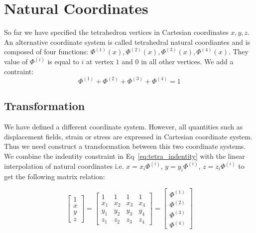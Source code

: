 \documentclass[en]{minipw} %
\begin{document}
\section{Natural Coordinates}

So far we have specified the tetrahedron vertices in Cartesian coordinates $x,y,z$. An alternative coordinate system is called tetrahedral natural coordiantes and is composed of four functions: $\Phi^{(1)}(x), \Phi^{(2)}(x), \Phi^{(3)}(x), \Phi^{(4)}(x)$. They value of $\Phi^{(i)}$ is equal to $i$ at vertex $1$ and 0 in all other vertices. We add a contraint:
\begin{equation}
\label{eq:tetra_indentity}
\Phi^{(1)} + \Phi^{(2)} + \Phi^{(3)} + \Phi^{(4)} = 1
\end{equation}

\subsection{Transformation}

We have defined a different coordinate system. However, all quantities such as displacement fields, strain or stress are expressed in Cartesian coordinate system. Thus we need construct a transformation between this two coordinate systems. We combine the indentity constraint in Eq~\ref{eq:tetra_indentity} with the linear interpolation of natural coordinates i.e. $x = x_i \Phi^{(i)}$, $y = y_i \Phi^{(i)}$, $z = z_i \Phi^{(i)}$ to get the following matrix relation:

\begin{equation}
\begin{bmatrix}
1 \\
x \\
y \\
z
\end{bmatrix}
=
\begin{bmatrix}
1 & 1 & 1 & 1 \\
x_1 & x_2 & x_3 & x_4 \\
y_1 & y_2 & y_3 & y_4 \\
z_1 & z_2 & z_3 & z_4
\end{bmatrix}
=
\begin{bmatrix}
\Phi^{(1)} \\
\Phi^{(2)} \\
\Phi^{(3)} \\
\Phi^{(4)}
\end{bmatrix}
\end{equation}
\end{document}
